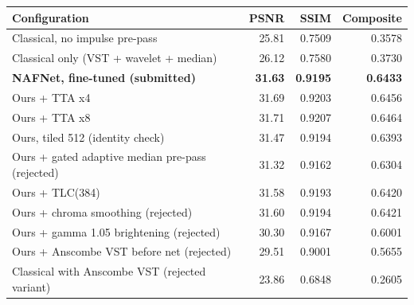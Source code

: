 \begin{tabular}{lrrr}
\toprule
Configuration & PSNR & SSIM & Composite \\
\midrule
Classical, no impulse pre-pass & 25.81 & 0.7509 & 0.3578 \\
Classical only (VST + wavelet + median) & 26.12 & 0.7580 & 0.3730 \\
\textbf{NAFNet, fine-tuned (submitted)} & \textbf{31.63} & \textbf{0.9195} & \textbf{0.6433} \\
Ours + TTA x4 & 31.69 & 0.9203 & 0.6456 \\
Ours + TTA x8 & 31.71 & 0.9207 & 0.6464 \\
Ours, tiled 512 (identity check) & 31.47 & 0.9194 & 0.6393 \\
\midrule
Ours + gated adaptive median pre-pass (rejected) & 31.32 & 0.9162 & 0.6304 \\
Ours + TLC(384) & 31.58 & 0.9193 & 0.6420 \\
Ours + chroma smoothing (rejected) & 31.60 & 0.9194 & 0.6421 \\
Ours + gamma 1.05 brightening (rejected) & 30.30 & 0.9167 & 0.6001 \\
Ours + Anscombe VST before net (rejected) & 29.51 & 0.9001 & 0.5655 \\
Classical with Anscombe VST (rejected variant) & 23.86 & 0.6848 & 0.2605 \\
\bottomrule
\end{tabular}
